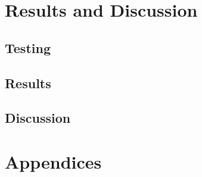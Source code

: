 \documentclass{report}
\begin{document}
\part{Results and Discussion}

\chapter{Testing}
	

\chapter{Results}
	

\chapter{Discussion}
	

\printindex
\printglossaries

\part{Appendices}
	



\nocite{*}
\end{document}
